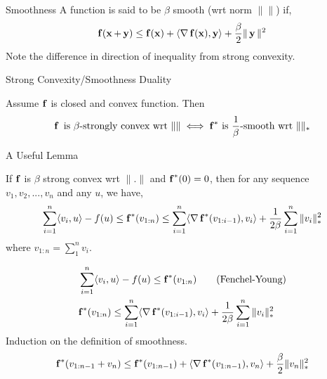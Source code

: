 \begin{frame}{Smoothness}
  A function is said to be $\beta$ smooth (wrt norm $\|\|$) if,
  \begin{align*}
    \operatorname{\mathbf{f}}(\operatorname{\mathbf{x}}+\operatorname{\mathbf{y}}) \le \operatorname{\mathbf{f}}(\operatorname{\mathbf{x}}) + \langle {\operatorname{\nabla}\operatorname{\mathbf{f}}(\operatorname{\mathbf{x}})} , {\operatorname{\mathbf{y}}} \rangle +\frac{\beta}{2} \|\operatorname{\mathbf{y}}\|^2
  \end{align*}
  Note the difference in direction of inequality from strong convexity.
\end{frame}

\begin{frame}{Strong Convexity/Smoothness Duality}
  \begin{theorem}
    Assume $\operatorname{\mathbf{f}}$ is closed and convex function. Then
    \begin{align*}
      \operatorname{\mathbf{f}} \text{ is } \beta\text{-strongly convex wrt }  \|\| \iff {\operatorname{\mathbf{f}}}^{*} \text{ is } \frac{1}{\beta}\text{-smooth wrt }  \|\|_{*}
    \end{align*}
  \end{theorem}
\end{frame}

\begin{frame}{A Useful Lemma}
  \begin{lemma}
    If $\operatorname{\mathbf{f}}$ is $\beta$ strong convex wrt $\|.\|$ and ${\operatorname{\mathbf{f}}}^{*}(0)=0$, then for any sequence $v_1,v_2,...,v_n$ and any $u$, we have,
    \begin{align*}
      \sum_{i=1}^n \langle {v_i} , {u} \rangle - f(u) \le {\operatorname{\mathbf{f}}}^{*}(v_{1:n}) \le \sum_{i=1}^n \langle {\operatorname{\nabla}{\operatorname{\mathbf{f}}}^{*}(v_{1:i-1})} , {v_i} \rangle +\frac{1}{2\beta} \sum_{i=1}^n \|v_i\|_{*}^2
    \end{align*}
    where $v_{1:n}=\sum_1^n v_i$.
  \end{lemma}
\end{frame}

\begin{frame}
    \begin{align*}
      & \sum_{i=1}^n \langle {v_i} , {u} \rangle - f(u) \le {\operatorname{\mathbf{f}}}^{*}(v_{1:n}) \tag{Fenchel-Young} \\
      & {\operatorname{\mathbf{f}}}^{*}(v_{1:n}) \le \sum_{i=1}^n \langle {\operatorname{\nabla}{\operatorname{\mathbf{f}}}^{*}(v_{1:i-1})} , {v_i} \rangle +\frac{1}{2\beta} \sum_{i=1}^n \|v_i\|_{*}^2
    \end{align*}
    Induction on the definition of smoothness.
    \begin{align*}
      {\operatorname{\mathbf{f}}}^{*}(v_{1:n-1}+v_n) \le {\operatorname{\mathbf{f}}}^{*}(v_{1:n-1}) + \langle {\operatorname{\nabla}{\operatorname{\mathbf{f}}}^{*}(v_{1:n-1})} , {v_n} \rangle +\frac{\beta}{2} \|v_n\|_{*}^2
    \end{align*}

\end{frame}


